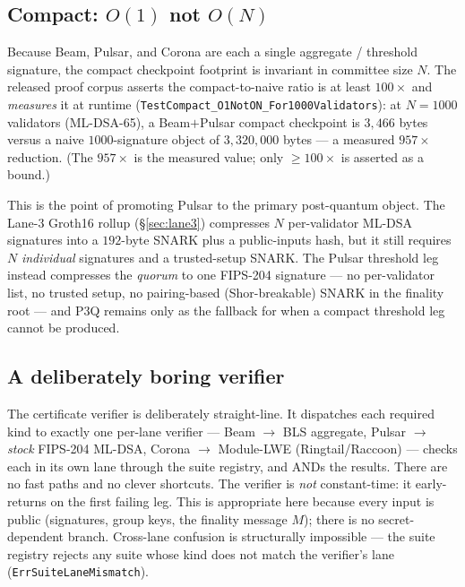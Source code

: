 \subsection{Compact: $O(1)$ not $O(N)$}
\label{sec:compact-cert:compact}

Because Beam, Pulsar, and Corona are each a single aggregate / threshold
signature, the compact checkpoint footprint is invariant in committee size
$N$. The released proof corpus asserts the compact-to-naive ratio is at
least $100\times$ and \emph{measures} it at runtime
(\texttt{TestCompact\_O1NotON\_For1000Validators}): at $N{=}1000$ validators
(ML-DSA-65), a Beam$+$Pulsar compact checkpoint is $3{,}466$ bytes versus a
naive $1000$-signature object of $3{,}320{,}000$ bytes --- a measured
$957\times$ reduction. (The $957\times$ is the measured value; only
$\geq 100\times$ is asserted as a bound.)

This is the point of promoting Pulsar to the primary post-quantum object.
The Lane-3 Groth16 rollup (\S\ref{sec:lane3}) compresses $N$ per-validator
ML-DSA signatures into a $192$-byte SNARK plus a public-inputs hash, but it
still requires $N$ \emph{individual} signatures and a trusted-setup SNARK.
The Pulsar threshold leg instead compresses the \emph{quorum} to one
FIPS-204 signature --- no per-validator list, no trusted setup, no
pairing-based (Shor-breakable) SNARK in the finality root --- and P3Q remains
only as the fallback for when a compact threshold leg cannot be produced.

\subsection{A deliberately boring verifier}
\label{sec:compact-cert:verifier}

The certificate verifier is deliberately straight-line. It dispatches each
required kind to exactly one per-lane verifier --- Beam $\to$ BLS aggregate,
Pulsar $\to$ \emph{stock} FIPS-204 ML-DSA, Corona $\to$ Module-LWE
(Ringtail/Raccoon) --- checks each in its own lane through the suite
registry, and ANDs the results. There
are no fast paths and no clever shortcuts. The verifier is \emph{not}
constant-time: it early-returns on the first failing leg. This is
appropriate here because every input is public (signatures, group keys, the
finality message $M$); there is no secret-dependent branch. Cross-lane
confusion is structurally impossible --- the suite registry rejects any
suite whose kind does not match the verifier's lane
(\texttt{ErrSuiteLaneMismatch}).

